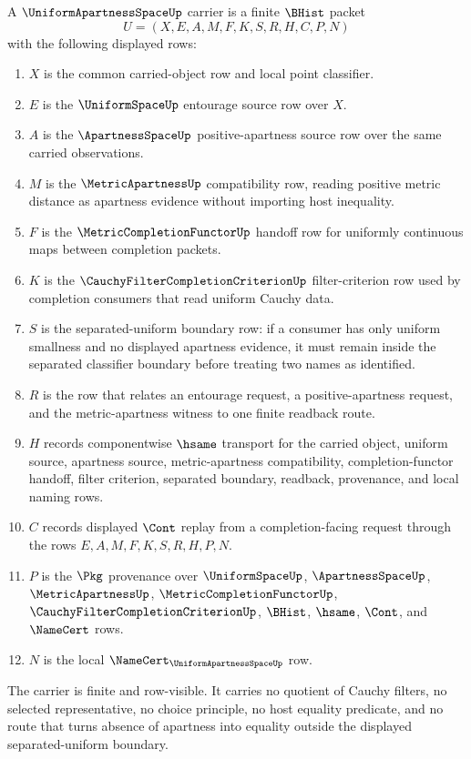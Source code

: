 \begin{definition}
\label{def:uniform-apartness-space-carrier}
A $\UniformApartnessSpaceUp$ carrier is a finite $\BHist$ packet
$$
U=(X,E,A,M,F,K,S,R,H,C,P,N)
$$
with the following displayed rows:
\begin{enumerate}
\item $X$ is the common carried-object row and local point classifier.
\item $E$ is the $\UniformSpaceUp$ entourage source row over $X$.
\item $A$ is the $\ApartnessSpaceUp$ positive-apartness source row over the
same carried observations.
\item $M$ is the $\MetricApartnessUp$ compatibility row, reading positive
metric distance as apartness evidence without importing host inequality.
\item $F$ is the $\MetricCompletionFunctorUp$ handoff row for uniformly
continuous maps between completion packets.
\item $K$ is the $\CauchyFilterCompletionCriterionUp$ filter-criterion row
used by completion consumers that read uniform Cauchy data.
\item $S$ is the separated-uniform boundary row: if a consumer has only
uniform smallness and no displayed apartness evidence, it must remain inside
the separated classifier boundary before treating two names as identified.
\item $R$ is the row that relates an entourage request, a positive-apartness
request, and the metric-apartness witness to one finite readback route.
\item $H$ records componentwise $\hsame$ transport for the carried object,
uniform source, apartness source, metric-apartness compatibility,
completion-functor handoff, filter criterion, separated boundary, readback,
provenance, and local naming rows.
\item $C$ records displayed $\Cont$ replay from a completion-facing request
through the rows $E,A,M,F,K,S,R,H,P,N$.
\item $P$ is the $\Pkg$ provenance over $\UniformSpaceUp$,
$\ApartnessSpaceUp$, $\MetricApartnessUp$, $\MetricCompletionFunctorUp$,
$\CauchyFilterCompletionCriterionUp$, $\BHist$, $\hsame$, $\Cont$, and
$\NameCert$ rows.
\item $N$ is the local $\NameCert_{\UniformApartnessSpaceUp}$ row.
\end{enumerate}
The carrier is finite and row-visible. It carries no quotient of Cauchy
filters, no selected representative, no choice principle, no host equality
predicate, and no route that turns absence of apartness into equality outside
the displayed separated-uniform boundary.
\end{definition}

